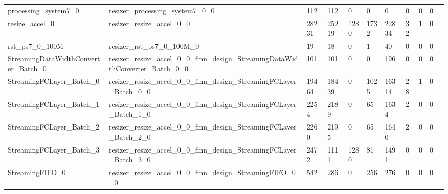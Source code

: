 \begin{landscape}
\begin{table}[!htb]
{\begin{tabular}{l|l|l|l|l|l|l|l|l|l|l}
   processing\_system7\_0                                  & resizer\_processing\_system7\_0\_0                                                                     & 112        & 112        & 0       & 0    & 0     & 0      & 0      & 0            \\
   resize\_accel\_0                                        & resizer\_resize\_accel\_0\_0                                                                           & 28231      & 25219      & 1280    & 1732 & 22834 & 32     & 1      & 0            \\
   rst\_ps7\_0\_100M                                       & resizer\_rst\_ps7\_0\_100M\_0                                                                          & 19         & 18         & 0       & 1    & 40    & 0      & 0      & 0            \\
   StreamingDataWidthConverter\_Batch\_0                   & resizer\_resize\_accel\_0\_0\_finn\_design\_StreamingDataWidthConverter\_Batch\_0\_0                   & 101        & 101        & 0       & 0    & 196   & 0      & 0      & 0            \\
   StreamingFCLayer\_Batch\_0                              & resizer\_resize\_accel\_0\_0\_finn\_design\_StreamingFCLayer\_Batch\_0\_0                              & 19464      & 18439      & 0       & 1025 & 16314 & 28     & 1      & 0            \\
   StreamingFCLayer\_Batch\_1                              & resizer\_resize\_accel\_0\_0\_finn\_design\_StreamingFCLayer\_Batch\_1\_0                              & 2254       & 2189       & 0       & 65   & 1634  & 2      & 0      & 0            \\
   StreamingFCLayer\_Batch\_2                              & resizer\_resize\_accel\_0\_0\_finn\_design\_StreamingFCLayer\_Batch\_2\_0                              & 2260       & 2195       & 0       & 65   & 1640  & 2      & 0      & 0            \\
   StreamingFCLayer\_Batch\_3                              & resizer\_resize\_accel\_0\_0\_finn\_design\_StreamingFCLayer\_Batch\_3\_0                              & 2472       & 1111       & 1280    & 81   & 1491  & 0      & 0      & 0            \\
   StreamingFIFO\_0                                        & resizer\_resize\_accel\_0\_0\_finn\_design\_StreamingFIFO\_0\_0                                        & 542        & 286        & 0       & 256  & 276   & 0      & 0      & 0            \\

\end{tabular}}
\end{table}
\end{landscape}
